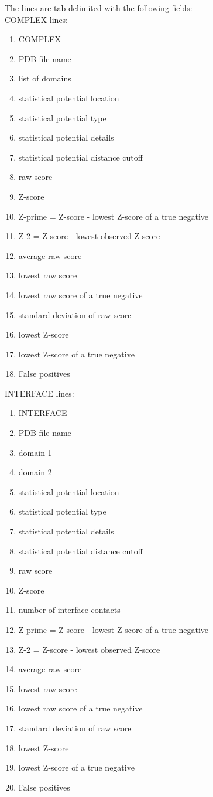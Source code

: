 \documentclass[11pt]{article}
\begin{document}
The lines are tab-delimited with the following fields:\\
COMPLEX lines:
\begin{enumerate}
   \item COMPLEX
   \item PDB file name
   \item list of domains
   \item statistical potential location
   \item statistical potential type
   \item statistical potential details
   \item statistical potential distance cutoff
   \item raw score
   \item Z-score
   \item Z-prime = Z-score - lowest Z-score of a true negative
   \item Z-2 = Z-score - lowest observed Z-score
   \item average raw score
   \item lowest raw score
   \item lowest raw score of a true negative
   \item standard deviation of raw score
   \item lowest Z-score
   \item lowest Z-score of a true negative
   \item False positives
\end{enumerate}

INTERFACE lines:
\begin{enumerate}
   \item INTERFACE
   \item PDB file name
   \item domain 1
   \item domain 2
   \item statistical potential location
   \item statistical potential type
   \item statistical potential details
   \item statistical potential distance cutoff
   \item raw score
   \item Z-score
   \item number of interface contacts
   \item Z-prime = Z-score - lowest Z-score of a true negative
   \item Z-2 = Z-score - lowest observed Z-score
   \item average raw score
   \item lowest raw score
   \item lowest raw score of a true negative
   \item standard deviation of raw score
   \item lowest Z-score
   \item lowest Z-score of a true negative
   \item False positives
\end{enumerate}
\end{document}
